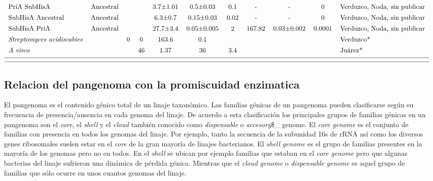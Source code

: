\documentclass[12pt,twoside]{reedthesis}
\begin{document}
\begin{landscape}
$${\begin{tabular}{ l c r c c c c c c c l}
  PriA SubHisA&Ancestral&&&3.7±1.01&0.5±0.03&0.1&-&-&0&Verduzco, Noda, sin publicar\\ [1ex]    
  SubHisA Ancestral&Ancestral&&&6.3±0.7&0.15±0.03&0.02&-&-&0&Verduzco, Noda, sin publicar\\ [1ex]    
  SubHisA PriA&Ancestral&&&27.7±3.4&0.05±0.005&2&167.82&0.03±0.002&0.0001&Verduzco, Noda, sin publicar\\ [1ex]    
  \textit{Streptomyces} \textit{acidiscabies}&&0&0&163.6&0.1&&&&&Verduzco*\\ [1ex]  
  \textit{A} \textit{visco} &&&46&1.37&36&3.4&&&&Juárez*\\ [1ex]  
  \hline \\ [-1.5ex]
  \hline
  \end{tabular}
  }
  \label{tab:cineticos}  
  $$   
  \end{landscape}
  
  \normalsize
  
  \subsection{Relacion del pangenoma con la promiscuidad
  enzimatica}\label{relacion-del-pangenoma-con-la-promiscuidad-enzimatica}
  
  El pangenoma es el contenido génico total de un linaje taxonómico. Las
  familias génicas de un pangenoma pueden clasificarse según su frecuencia
  de presencia/ausencia en cada genoma del linaje. De acuerdo a esta
  clasificación los principales grupos de familias génicas en un pangenoma
  son el \emph{core}, el \emph{shell} y el \emph{cloud} también conocido
  como \emph{dispensable} o \emph{accesory}\$\_ genome. El \emph{core
  genome} es el conjunto de familias con presencia en todos los genomas
  del linaje. Por ejemplo, tanto la secuencia de la subunidad 16s de rRNA
  así como los diversos genes ribosomales suelen estar en el \emph{core}
  de la gran mayoría de linajes bacterianos. El \emph{shell genome} es el
  grupo de familias presentes en la mayoría de los genomas pero no en
  todos. En el \emph{shell} se ubican por ejemplo familias que estaban en
  el \emph{core genome} pero que algunas bacterias del linaje sufrieron
  una dinámica de pérdida génica. Mientras que el \emph{cloud genome} o
  \emph{dispensable genome} es aquel grupo de familias que sólo ocurre en
  unos cuantos genomas del linaje.
  
\end{document}
